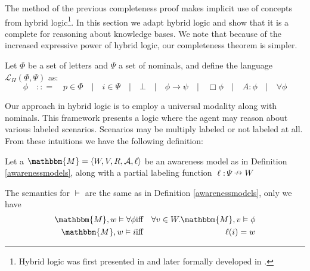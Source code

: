 The method of the previous completeness proof makes implicit use of concepts from
hybrid logic{\footnote{Hybrid logic was first presented in
{\cite{prior_revised_1969}} and later formally developed in
{\cite{bull_approach_1970}}.}}.  In this section we adapt hybrid logic and
show that it is a complete for reasoning about knowledge bases.  We note that
because of the increased expressive power of hybrid logic, our completeness
theorem is simpler.

\begin{definition}
  Let $\Phi$ be a set of letters and $\Psi$ a set of nominals, and define the
  language $\mathcal{L}_H (\Phi, \Psi)$ as:
  \[ \phi \hspace{1em} : : = \hspace{1em} p \in \Phi \hspace{1em} |
     \hspace{1em} i \in \Psi \hspace{1em} | \hspace{1em} \bot \hspace{1em} |
     \hspace{1em} \phi \rightarrow \psi \hspace{1em} | \hspace{1em} \Box \phi
     \hspace{1em} | \hspace{1em} A : \phi \hspace{1em} | \hspace{1em} \forall
     \phi \]
\end{definition}

Our approach in hybrid logic is to employ a universal modality along with
nominals.  This framework presents a logic where the agent may reason about
various labeled scenarios.  Scenarios may be multiply labeled or not labeled
at all.  From these intuitions we have the following definition:

\begin{definition}
  \label{hybridsemantics}Let a  $\mathbbm{M}= \langle
  W, V, R, \mathcal{A}, \ell \rangle$ be an awareness model as in Definition
  \ref{awarenessmodels}, along with a partial labeling function $\ell : \Psi
  \nrightarrow W$
  
  
  
  The semantics for $\vDash$ are the same as in Definition
  \ref{awarenessmodels}, only we have
  \begin{eqnarray*}
    \mathbbm{M}, w \vDash \forall \phi & \text{iff} & \forall v \in
    W.\mathbbm{M}, v \vDash \phi\\
    \mathbbm{M}, w \vDash i & \text{iff} & \ell (i) = w
  \end{eqnarray*}
\end{definition}

